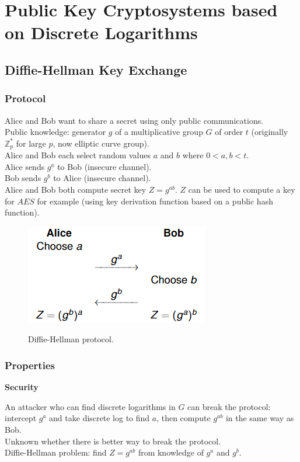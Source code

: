 \documentclass{article}
\begin{document}
\newpage \section{Public Key Cryptosystems based on Discrete Logarithms}

\subsection{Diffie-Hellman Key Exchange}

\subsubsection{Protocol}

Alice and Bob want to share a secret using only public communications.\\
Public knowledge: generator $g$ of a multiplicative group $G$ of order $t$ (originally $\mathbb{Z}_p^*$ for large $p$, now elliptic curve group).\\
Alice and Bob each select random values $a$ and $b$ where $0<a,b<t$.\\
Alice sends $g^a$ to Bob (insecure channel).\\
Bob sends $g^b$ to Alice (insecure channel).\\
Alice and Bob both compute secret key $Z=g^{ab}$. $Z$ can be used to compute a key for $AES$ for example (using key derivation function based on a public hash function).

\begin{figure}[H]
\centering
\includegraphics[scale=0.7]{Images/diffiehellmanprotocol.png}
\label{fig:fround}
\caption{Diffie-Hellman protocol.}
\end{figure}

\subsubsection{Properties}

\textbf{Security}

An attacker who can find discrete logarithms in $G$ can break the protocol: intercept $g^a$ and take discrete log to find $a$, then compute $g^{ab}$ in the same way as Bob.\\
Unknown whether there is better way to break the protocol.\\
Diffie-Hellman problem: find $Z=g^{ab}$ from knowledge of $g^a$ and $g^b$.
\end{document}
